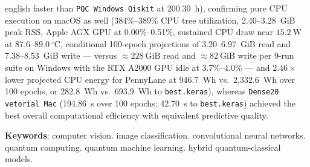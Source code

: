 \documentclass[
    12pt,
    openright,
    oneside,
    a4paper,
    english,
    brazil
]{abntex2}
\begin{document}
\begin{resumo}[Abstract]
\begin{otherlanguage*}{english}
faster than \texttt{PQC Windows Qiskit} at 200.30~h), confirming pure CPU execution on macOS as well (384\%--389\% CPU tree utilization, 2.40--3.28~GiB peak RSS, Apple AGX GPU at 0.00\%--0.51\%, sustained CPU draw near \(15.2~\text{W}\) at \(87.6\text{--}89.0~^\circ\text{C}\), conditional 100-epoch projections of 3.20--6.97~GiB read and 7.38--8.53~GiB write --- versus \(\approx 228~\text{GiB}\) read and \(\approx 82~\text{GiB}\) write per 9-run suite on Windows with the RTX A2000 GPU idle at 3.7\%--4.0\% --- and \(2.46\times\) lower projected CPU energy for PennyLane at 946.7~Wh vs.\ 2,332.6~Wh over 100 epochs, or 282.8~Wh vs.\ 693.9~Wh to \texttt{best.keras}), whereas \texttt{Dense20 vetorial Mac} (194.86~s over 100 epochs; 42.70~s to \texttt{best.keras}) achieved the best overall computational efficiency with equivalent predictive quality.

\vspace{\onelineskip}
\noindent
\textbf{Keywords}: computer vision. image classification. convolutional neural networks. quantum computing. quantum machine learning. hybrid quantum-classical models.
\end{otherlanguage*}
\end{resumo}

\listoffigures*
\cleardoublepage

\listoftables*
\cleardoublepage

\end{document}
